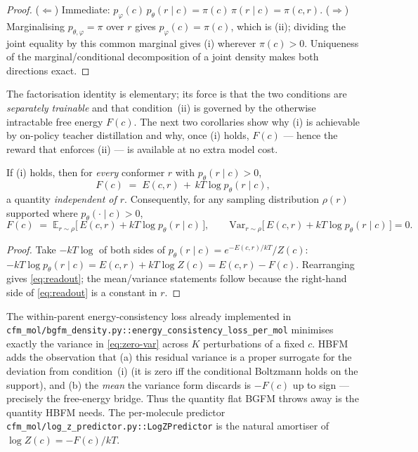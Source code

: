 \begin{proof}
($\Leftarrow$) Immediate: $p_\varphi(c)\,p_\theta(r\mid c) = \pi(c)\,\pi(r\mid c) = \pi(c,r)$.
($\Rightarrow$) Marginalising $p_{\theta,\varphi}=\pi$ over $r$ gives $p_\varphi(c)=\pi(c)$,
which is (ii); dividing the joint equality by this common marginal gives (i) wherever
$\pi(c)>0$. Uniqueness of the marginal/conditional decomposition of a joint density
makes both directions exact.
\end{proof}

The factorisation identity is elementary; its force is that the two conditions are
\emph{separately trainable} and that condition~(ii) is governed by the otherwise
intractable free energy $F(c)$. The next two corollaries show why (i) is achievable
by on-policy teacher distillation and why, once (i) holds, $F(c)$ — hence the reward
that enforces (ii) — is available at no extra model cost.

\begin{corollary}
\label{cor:readout}
If (i) holds, then for \emph{every} conformer $r$ with $p_\theta(r\mid c)>0$,
\begin{equation}
F(c) \;=\; E(c,r) \,+\, kT \log p_\theta(r\mid c),
\label{eq:readout}
\end{equation}
a quantity \emph{independent of $r$}. Consequently, for any sampling distribution
$\rho(r)$ supported where $p_\theta(\cdot\mid c)>0$,
\begin{equation}
F(c) \;=\; \mathbb{E}_{r\sim\rho}\!\big[\,E(c,r) + kT\log p_\theta(r\mid c)\,\big],
\qquad
\mathrm{Var}_{r\sim\rho}\!\big[\,E(c,r) + kT\log p_\theta(r\mid c)\,\big] = 0.
\label{eq:zero-var}
\end{equation}
\end{corollary}

\begin{proof}
Take $-kT\log$ of both sides of $p_\theta(r\mid c)=e^{-E(c,r)/kT}/Z(c)$:
$-kT\log p_\theta(r\mid c) = E(c,r) + kT\log Z(c) = E(c,r) - F(c)$. Rearranging gives
\eqref{eq:readout}; the mean/variance statements follow because the right-hand side of
\eqref{eq:readout} is a constant in $r$.
\end{proof}

\begin{remark}
The within-parent energy-consistency loss already implemented in
\texttt{cfm\_mol/bgfm\_density.py::energy\_consistency\_loss\_per\_mol} minimises exactly
the variance in \eqref{eq:zero-var} across $K$ perturbations of a fixed $c$. HBFM adds
the observation that (a) this residual variance is a proper surrogate for the deviation
from condition~(i) (it is zero iff the conditional Boltzmann holds on the support), and
(b) the \emph{mean} the variance form discards is $-F(c)$ up to sign — precisely the
free-energy bridge. Thus the quantity flat BGFM throws away is the quantity HBFM needs.
The per-molecule predictor \texttt{cfm\_mol/log\_z\_predictor.py::LogZPredictor} is the
natural amortiser of $\log Z(c) = -F(c)/kT$.
\end{remark}

